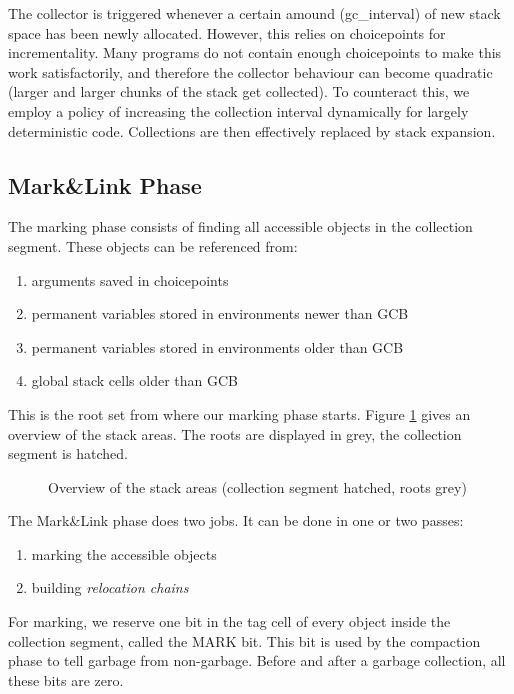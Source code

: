 The collector is triggered whenever a certain amound (gc_interval) of new
stack space has been newly allocated.  However, this relies on
choicepoints for incrementality.  Many programs do not contain enough
choicepoints to make this work satisfactorily, and therefore the
collector behaviour can become quadratic (larger and larger chunks of
the stack get collected).  To counteract this, we employ a policy of
increasing the collection interval dynamically for largely deterministic
code.  Collections are then effectively replaced by stack expansion.


\subsection{Mark\&Link Phase}

The marking phase consists of finding all accessible objects in the
collection segment. These objects can be referenced from:
\begin{enumerate}
\label{reftypes}
\item arguments saved in choicepoints
\item permanent variables stored in environments newer than GCB
\item permanent variables stored in environments older than GCB
\item global stack cells older than GCB
\end{enumerate}
This is the root set from where our marking phase starts.
Figure \ref{stackov} gives an overview of the stack areas.
The roots are displayed in grey, the collection segment is hatched.

\begin{figure}
\caption{Overview of the stack areas (collection segment hatched,
roots grey)}
\label{stackov}
\end{figure}

\noindent
The Mark\&Link phase does two jobs. It can be done in
one or two passes:
\begin{enumerate}
\item marking the accessible objects
\item building {\em relocation chains}
\end{enumerate}
For marking, we reserve one bit in the tag cell of every object
inside the collection segment, called the MARK bit.
This bit is used by the compaction phase to tell garbage from
non-garbage. Before and after a garbage collection, all these bits
are zero.

